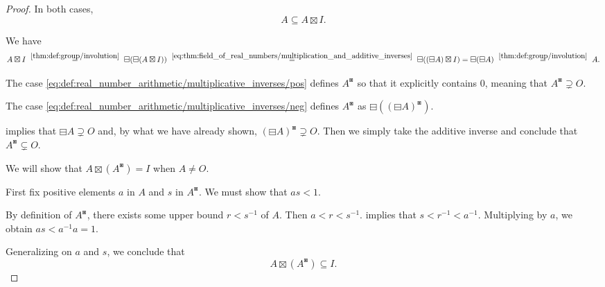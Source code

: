 \begin{proof}
  In both cases,
  \begin{equation*}
    A \subseteq A \boxtimes I.
  \end{equation*}

   We have
  \begin{equation*}
    A \boxtimes I
    \reloset {\ref{thm:def:group/involution}} =
    \boxminus (\boxminus (A \boxtimes I))
    \reloset {\eqref{eq:thm:field_of_real_numbers/multiplication_and_additive_inverses}} =
    \boxminus ((\boxminus A) \boxtimes I)
    =
    \boxminus (\boxminus A)
    \reloset {\ref{thm:def:group/involution}} =
    A.
  \end{equation*}


   The case \eqref{eq:def:real_number_arithmetic/multiplicative_inverses/pos} defines \( A^\boxast \) so that it explicitly contains \( 0 \), meaning that \( A^\boxast \supsetneq O \).

   The case \eqref{eq:def:real_number_arithmetic/multiplicative_inverses/neg} defines \( A^\boxast \) as \( \boxminus ((\boxminus A)^\boxast) \).

   implies that \( \boxminus A \supsetneq O \) and, by what we have already shown, \( (\boxminus A)^\boxast \supsetneq O \). Then we simply take the additive inverse and conclude that \( A^\boxast \subsetneq O \).

   We will show that \( A \boxtimes (A^\boxast) = I \) when \( A \neq O \).

   First fix positive elements \( a \) in \( A \) and \( s \) in \( A^\boxast \). We must show that \( as < 1 \).

  By definition of \( A^\boxast \), there exists some upper bound \( r < s^{-1} \) of \( A \). Then \( a < r < s^{-1} \).  implies that \( s < r^{-1} < a^{-1} \). Multiplying by \( a \), we obtain \( as < a^{-1} a = 1 \).

  Generalizing on \( a \) and \( s \), we conclude that
  \begin{equation*}
    A \boxtimes (A^\boxast) \subseteq I.
  \end{equation*}


\end{proof}
